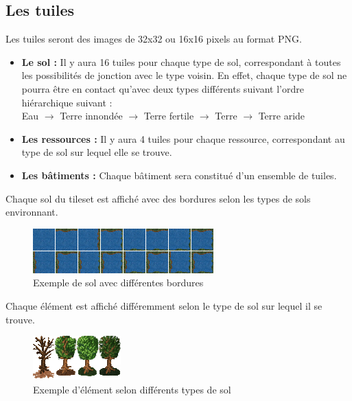 \documentclass[a4paper]{memoir}
\begin{document}
			\subsection{Les tuiles}
				\label{Tuile}
				Les tuiles seront des images de 32x32 ou 16x16 pixels au format PNG.\\
				\begin{itemize}[label=$\bullet$]
					\item \textbf{Le sol :} Il y aura 16 tuiles pour chaque type de sol, correspondant à toutes les possibilités de jonction avec le type voisin. En effet, chaque type de sol ne pourra être en contact qu'avec deux types différents suivant l'ordre hiérarchique suivant :\\
					Eau $\rightarrow$ Terre innondée $\rightarrow$ Terre fertile $\rightarrow$ Terre $\rightarrow$ Terre aride
					\item \textbf{Les ressources :} Il y aura 4 tuiles pour chaque ressource, correspondant au type de sol sur lequel elle se trouve.
					\item \textbf{Les bâtiments :} Chaque bâtiment sera constitué d'un ensemble de tuiles.
				\end{itemize}
				Chaque sol du tileset est affiché avec des bordures selon les types de sols environnant.\\
				\begin{figure}[H]
					\begin{center}
						\includegraphics[scale=0.2]{img/groundSample.png}
					\end{center}
					\label{fig:groundSample}
					\caption{Exemple de sol avec différentes bordures}
				\end{figure}
				Chaque élément est affiché différemment selon le type de sol sur lequel il se trouve.\\
				\begin{figure}[H]
					\begin{center}
						\includegraphics[scale=0.2]{img/elementSample.png}
					\end{center}
					\label{fig:elementSample}
					\caption{Exemple d'élément selon différents types de sol}
				\end{figure}
	
\end{document}
